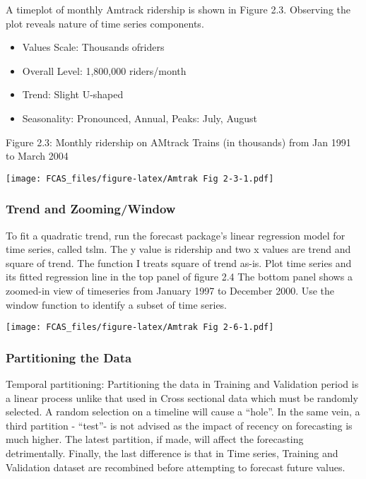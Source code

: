 \documentclass[]{article}
\begin{document}
A timeplot of monthly Amtrack ridership is shown in Figure 2.3.
Observing the plot reveals nature of time series components.

\begin{itemize}
\item
  Values Scale: Thousands ofriders
\item
  Overall Level: 1,800,000 riders/month
\item
  Trend: Slight U-shaped
\item
  Seasonality: Pronounced, Annual, Peaks: July, August
\end{itemize}

Figure 2.3: Monthly ridership on AMtrack Trains (in thousands) from Jan
1991 to March 2004

\texttt{[image: FCAS\_files/figure-latex/Amtrak Fig 2-3-1.pdf]}

\subsubsection{Trend and Zooming/Window}\label{trend-and-zoomingwindow}

To fit a quadratic trend, run the forecast package's linear regression
model for time series, called tslm. The y value is ridership and two x
values are trend and square of trend. The function I treats square of
trend as-is. Plot time series and its fitted regression line in the top
panel of figure 2.4 The bottom panel shows a zoomed-in view of
timeseries from January 1997 to December 2000. Use the window function
to identify a subset of time series.

\texttt{[image: FCAS\_files/figure-latex/Amtrak Fig 2-6-1.pdf]}

\subsubsection{Partitioning the Data}\label{partitioning-the-data}

Temporal partitioning: Partitioning the data in Training and Validation
period is a linear process unlike that used in Cross sectional data
which must be randomly selected. A random selection on a timeline will
cause a ``hole''. In the same vein, a third partition - ``test''- is not
advised as the impact of recency on forecasting is much higher. The
latest partition, if made, will affect the forecasting detrimentally.
Finally, the last difference is that in Time series, Training and
Validation dataset are recombined before attempting to forecast future
values.
\end{document}
